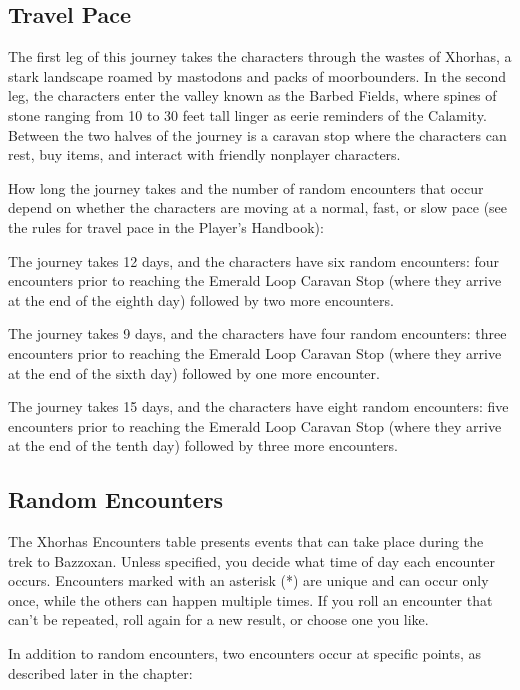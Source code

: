\documentclass[10pt,a4paper,twoside,twocolumn,openany,nodeprecatedcode]{dndbook}
\begin{document}
\subsection{Travel Pace}
The first leg of this journey takes the characters through the wastes of Xhorhas, a stark landscape roamed by mastodons and packs of moorbounders. In the second leg, the characters enter the valley known as the Barbed Fields, where spines of stone ranging from 10 to 30 feet tall linger as eerie reminders of the Calamity. Between the two halves of the journey is a caravan stop where the characters can rest, buy items, and interact with friendly nonplayer characters.

How long the journey takes and the number of random encounters that occur depend on whether the characters are moving at a normal, fast, or slow pace (see the rules for travel pace in the Player's Handbook):


\begin{description}[nolistsep]
\item[Normal Pace.]
The journey takes 12 days, and the characters have six random encounters: four encounters prior to reaching the Emerald Loop Caravan Stop (where they arrive at the end of the eighth day) followed by two more encounters.
\item[Fast Pace.]
The journey takes 9 days, and the characters have four random encounters: three encounters prior to reaching the Emerald Loop Caravan Stop (where they arrive at the end of the sixth day) followed by one more encounter.
\item[Slow Pace.]
The journey takes 15 days, and the characters have eight random encounters: five encounters prior to reaching the Emerald Loop Caravan Stop (where they arrive at the end of the tenth day) followed by three more encounters.
\end{description}

\subsection{Random Encounters}
The Xhorhas Encounters table presents events that can take place during the trek to Bazzoxan. Unless specified, you decide what time of day each encounter occurs. Encounters marked with an asterisk (*) are unique and can occur only once, while the others can happen multiple times. If you roll an encounter that can't be repeated, roll again for a new result, or choose one you like.

In addition to random encounters, two encounters occur at specific points, as described later in the chapter:
\end{document}
